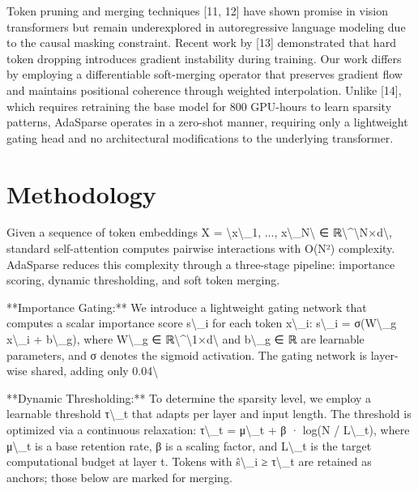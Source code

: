 \documentclass[11pt,a4paper]{article}
\begin{document}
Token pruning and merging techniques [11, 12] have shown promise in vision transformers but remain underexplored in autoregressive language modeling due to the causal masking constraint. Recent work by [13] demonstrated that hard token dropping introduces gradient instability during training. Our work differs by employing a differentiable soft-merging operator that preserves gradient flow and maintains positional coherence through weighted interpolation. Unlike [14], which requires retraining the base model for 800 GPU-hours to learn sparsity patterns, AdaSparse operates in a zero-shot manner, requiring only a lightweight gating head and no architectural modifications to the underlying transformer.

\section{Methodology}
Given a sequence of token embeddings X = \textbackslash{}{x\textbackslash{}_1, ..., x\textbackslash{}_N\textbackslash{}} ∈ ℝ\textbackslash{}^{}\textbackslash{}{N×d\textbackslash{}}, standard self-attention computes pairwise interactions with O(N²) complexity. AdaSparse reduces this complexity through a three-stage pipeline: importance scoring, dynamic thresholding, and soft token merging.

**Importance Gating:** We introduce a lightweight gating network that computes a scalar importance score s\textbackslash{}_i for each token x\textbackslash{}_i:
s\textbackslash{}_i = σ(W\textbackslash{}_g x\textbackslash{}_i + b\textbackslash{}_g), 
where W\textbackslash{}_g ∈ ℝ\textbackslash{}^{}\textbackslash{}{1×d\textbackslash{}} and b\textbackslash{}_g ∈ ℝ are learnable parameters, and σ denotes the sigmoid activation. The gating network is layer-wise shared, adding only 0.04\textbackslash{}%

**Dynamic Thresholding:** To determine the sparsity level, we employ a learnable threshold τ\textbackslash{}_t that adapts per layer and input length. The threshold is optimized via a continuous relaxation:
τ\textbackslash{}_t = μ\textbackslash{}_t + β · log(N / L\textbackslash{}_t),
where μ\textbackslash{}_t is a base retention rate, β is a scaling factor, and L\textbackslash{}_t is the target computational budget at layer t. Tokens with ŝ\textbackslash{}_i ≥ τ\textbackslash{}_t are retained as anchors; those below are marked for merging.
\end{document}
